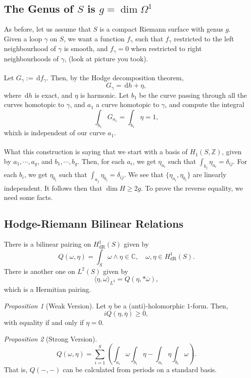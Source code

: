 \documentclass[a4paper]{report}
\theoremstyle{definition}
\theoremstyle{remark}
\theoremstyle{proposition}
\newtheorem{proposition}{Proposition}
\theoremstyle{conjecture}
\theoremstyle{lemma}
\theoremstyle{corollary}
\theoremstyle{exercise}
\theoremstyle{example}
\newcommand{\C}{\mathbb{C}}
\newcommand{\diff}{\,\mathrm{d}}
\newcommand{\on}{\operatorname}
\begin{document}
\subsection{The Genus of $S$ is $g = \dim \Omega^1$}

As before, let us assume that $S$ is a compact Riemann surface with genus 
$g$. Given a loop $\gamma$ on $S$, we want a function $f_\gamma$ 
such that $f_\gamma$ restricted to the left neighbourhood of $\gamma$ is 
smooth, and $f_\gamma = 0$ when restricted to right neighbourhoods of $\gamma$,
(look at picture you took).\\\\
Let $G_\gamma := \diff f_\gamma$. Then, by the Hodge decomposition theorem,
$$G_\gamma = \diff h + \eta,$$
where $\diff h$ is exact, and $\eta$ is harmonic. Let $b_1$ be the curve
passing through all the curves homotopic to $\gamma$, and $a_1$ a curve 
homotopic to $\gamma$, and compute the integral
$$\int_{b_1} G_{a_1} =\int_{b_1} \eta = 1,$$
whixh is independent of our curve $a_1$.\\\\
What this construction is saying that we start with a basis of 
$H_1(S,\mathbb{Z})$, given by $a_1,\cdots,a_g$, and $b_1,\cdots,b_g$.
Then, for each $a_i$, we get $\eta_{a_i}$ such that $\int_{b_j}\eta_{a_i}=\delta_{ij}$.
For each $b_i$, we get $\eta_{b_i}$ such that 
$\int_{a_j} \eta_{b_i}=\delta_{ij}$. 
We see that $\lbrace \eta_{a_i},\eta_{b_i}\rbrace$ are linearly independent.
It follows then that $\dim H \geq 2g$. To prove the reverse equality, 
we need some facts.

\subsection{Hodge-Riemann Bilinear Relations}

There is a bilinear pairing on $H^1_{\on{dR}}(S)$ given by 
$$Q(\omega,\eta) = \int_S \omega \wedge \eta \in \C,\quad \omega,\eta\in H^1_{\on{dR}}(S).$$
There is another one on $L^2(S)$ given by 
$$\langle\eta,\omega\rangle_{L^2} = Q(\eta, \ast\overline{\omega}),$$
which is a Hermitian pairing.

\begin{proposition}[Weak Version]
    Let $\eta$ be a (anti)-holomorphic $1$-form. Then, 
    $$iQ(\eta, \overline{\eta}) \geq 0,$$
    with equality if and only if $\eta = 0$. 
\end{proposition}

\begin{proposition}[Strong Version]\label{prop_bilinear_form}
    $$Q(\omega,\eta) = \sum_{i=1}^g\left(\int_{a_i} \omega \int_{b_i} \eta - \int_{a_i}\eta \int_{b_i} \omega\right).$$
    That is, $Q(-,-)$ can be calculated from periods on a standard basis.
\end{proposition}
\end{document}
